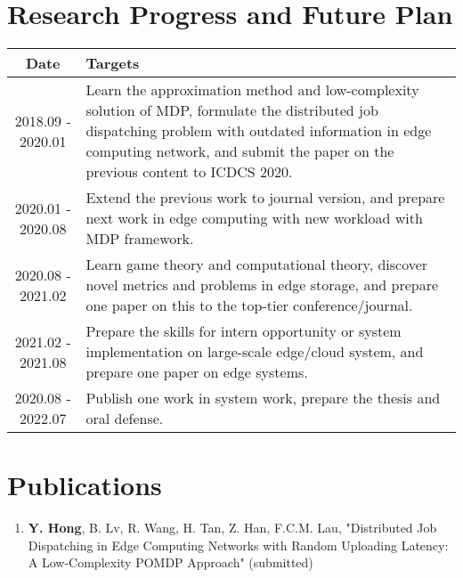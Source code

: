 \section{Research Progress and Future Plan}

\begin{center}
    \begin{tabularx}{0.90\linewidth}{ |c|X| }
        \hline  \textbf{Date}      & \textbf{Targets} \\
        \hline  {2018.09 - 2020.01}  & 
                {Learn the approximation method and low-complexity solution of MDP, formulate the distributed job dispatching problem with outdated information in edge computing network, and submit the paper on the previous content to ICDCS 2020.} \\
        \hline  {2020.01 - 2020.08}  & 
                {Extend the previous work to journal version, and prepare next work in edge computing with new workload with MDP framework.} \\
        \hline  {2020.08 - 2021.02}  & 
                {Learn game theory and computational theory, discover novel metrics and problems in edge storage, and prepare one paper on this to the top-tier conference/journal.} \\
        \hline  {2021.02 - 2021.08}  & 
                {Prepare the skills for intern opportunity or system implementation on large-scale edge/cloud system, and prepare one paper on edge systems.} \\
        \hline  {2020.08 - 2022.07}  & 
                {Publish one work in system work, prepare the thesis and oral defense.} \\
        \hline
    \end{tabularx}
\end{center}

\section{Publications}
\begin{enumerate}
    \item \textbf{Y. Hong}, {B. Lv}, {R. Wang}, {H. Tan}, {Z. Han}, {F.C.M. Lau}, "Distributed Job Dispatching in Edge Computing Networks with Random Uploading Latency: A Low-Complexity POMDP Approach" (submitted)
\end{enumerate}